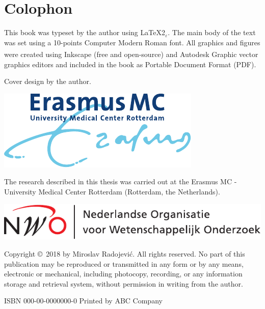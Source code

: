 %
%

\newpage
\setlength{\parindent}{0pt}
\thispagestyle{empty}

\section*{Colophon}

\bigskip
This book was typeset by the author using \LaTeX{}2{\LARGE $_{\varepsilon}$}. The main body of the text was set using a 10-points Computer Modern Roman font. All graphics and figures were created using Inkscape (free and open-source) and Autodesk \textsuperscript{\textregistered}Graphic vector graphics editors and included in the book as Portable Document Format (PDF). %

\bigskip
Cover design by the author.%
\bigskip

\vfill
\includegraphics[height=0.08\textheight]{./logos/emc1}

The research described in this thesis was carried out at the Erasmus MC - University Medical Center Rotterdam (Rotterdam, the Netherlands). 
\bigskip

\includegraphics[height=0.07\textheight]{./logos/nwo-nl}

\bigskip

Copyright \copyright\ 2018 by Miroslav Radojevi\'{c}. All rights reserved. No part of this publication may be reproduced or transmitted in any form or by any means, electronic or mechanical, including photocopy, recording, or any information storage and retrieval system, without permission in writing from the author.

\bigskip
ISBN 000-00-0000000-0
\bigskip
Printed by ABC Company
\setlength{\parindent}{\myindent}

